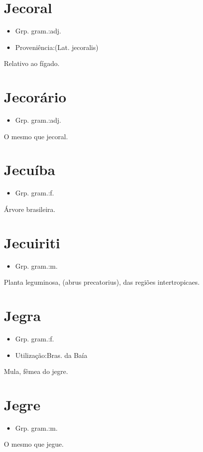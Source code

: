 \documentclass{article}
\begin{document}
\section{Jecoral}
\begin{itemize}
\item {Grp. gram.:adj.}
\end{itemize}
\begin{itemize}
\item {Proveniência:(Lat. \textunderscore jecoralis\textunderscore )}
\end{itemize}
Relativo ao fígado.
\section{Jecorário}
\begin{itemize}
\item {Grp. gram.:adj.}
\end{itemize}
O mesmo que \textunderscore jecoral\textunderscore .
\section{Jecuíba}
\begin{itemize}
\item {Grp. gram.:f.}
\end{itemize}
Árvore brasileira.
\section{Jecuiriti}
\begin{itemize}
\item {Grp. gram.:m.}
\end{itemize}
Planta leguminosa, (\textunderscore abrus precatorius\textunderscore ), das regiões intertropicaes.
\section{Jegra}
\begin{itemize}
\item {Grp. gram.:f.}
\end{itemize}
\begin{itemize}
\item {Utilização:Bras. da Baía}
\end{itemize}
Mula, fêmea do jegre.
\section{Jegre}
\begin{itemize}
\item {Grp. gram.:m.}
\end{itemize}
O mesmo que \textunderscore jegue\textunderscore .
\end{document}
